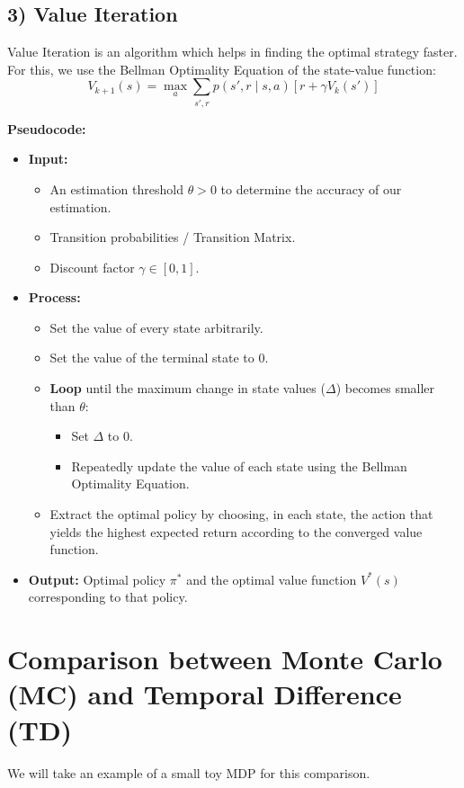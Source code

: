 \documentclass[12pt]{article}
\begin{document}
\subsection*{3) Value Iteration}
Value Iteration is an algorithm which helps in finding the optimal strategy faster. For this, we use the Bellman Optimality Equation of the state-value function:
$$V_{k+1}(s) = \max_a \sum_{s', r} p(s', r \mid s, a) \left[ r + \gamma V_k(s') \right]$$

\noindent\textbf{Pseudocode:}
\begin{itemize}[label=$\bullet$]
    \item \textbf{Input:}
    \begin{itemize}[label=$\circ$]
        \item An estimation threshold $\theta > 0$ to determine the accuracy of our estimation.
        \item Transition probabilities / Transition Matrix.
        \item Discount factor $\gamma \in [0,1]$.
    \end{itemize}
    \item \textbf{Process:}
    \begin{itemize}[label=$\circ$]
        \item Set the value of every state arbitrarily.
        \item Set the value of the terminal state to 0.
        \item \textbf{Loop} until the maximum change in state values ($\Delta$) becomes smaller than $\theta$:
        \begin{itemize}[label=--]
            \item Set $\Delta$ to 0.
            \item Repeatedly update the value of each state using the Bellman Optimality Equation.
        \end{itemize}
        \item Extract the optimal policy by choosing, in each state, the action that yields the highest expected return according to the converged value function.
    \end{itemize}
    \item \textbf{Output:} Optimal policy $\pi^*$ and the optimal value function $V^*(s)$ corresponding to that policy.
\end{itemize}

\vspace{0.5cm}

\section*{Comparison between Monte Carlo (MC) and Temporal Difference (TD)}
We will take an example of a small toy MDP for this comparison.
\end{document}
